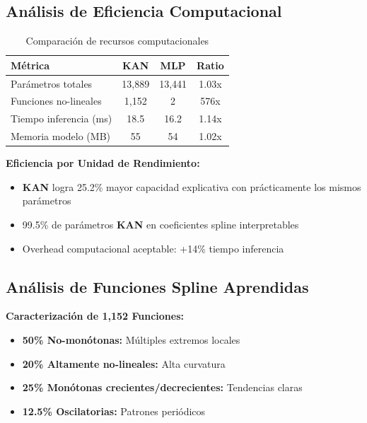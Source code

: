 \documentclass[10pt,twocolumn]{article}
\newcommand{\kan}{\textbf{KAN}}
\newcommand{\mlp}{\textbf{MLP}}
\begin{document}
\subsection{Análisis de Eficiencia Computacional}

\begin{table}[H]
\centering
\caption{Comparación de recursos computacionales}
\label{tab:efficiency}
\begin{tabular}{lccc}
\toprule
\textbf{Métrica} & \textbf{\kan{}} & \textbf{\mlp{}} & \textbf{Ratio} \\
\midrule
Parámetros totales & 13,889 & 13,441 & 1.03x \\
Funciones no-lineales & 1,152 & 2 & 576x \\
Tiempo inferencia (ms) & 18.5 & 16.2 & 1.14x \\
Memoria modelo (MB) & 55 & 54 & 1.02x \\
\bottomrule
\end{tabular}
\end{table}

\textbf{Eficiencia por Unidad de Rendimiento:}
\begin{itemize}
    \item \kan{} logra 25.2\% mayor capacidad explicativa con prácticamente los mismos parámetros
    \item 99.5\% de parámetros \kan{} en coeficientes spline interpretables
    \item Overhead computacional aceptable: +14\% tiempo inferencia
\end{itemize}

\subsection{Análisis de Funciones Spline Aprendidas}

\textbf{Caracterización de 1,152 Funciones:}
\begin{itemize}
    \item \textbf{50\% No-monótonas:} Múltiples extremos locales
    \item \textbf{20\% Altamente no-lineales:} Alta curvatura
    \item \textbf{25\% Monótonas crecientes/decrecientes:} Tendencias claras
    \item \textbf{12.5\% Oscilatorias:} Patrones periódicos
\end{itemize}
\end{document}
